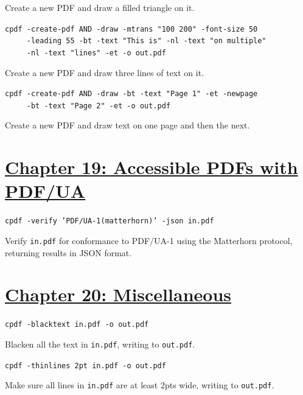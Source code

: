 \documentclass{book}
\begin{document}
\noindent Create a new PDF and draw a filled triangle on it.

\begin{framed}
 \noindent\small\verb?cpdf -create-pdf AND -draw -mtrans "100 200" -font-size 50?\\
 \noindent\small\verb?     -leading 55 -bt -text "This is" -nl -text "on multiple"?\\
 \noindent\small\verb?     -nl -text "lines" -et -o out.pdf?
\end{framed}

\noindent Create a new PDF and draw three lines of text on it.

\begin{framed}
 \noindent\small\verb!cpdf -create-pdf AND -draw -bt -text "Page 1" -et -newpage!\\
 \noindent\small\verb!     -bt -text "Page 2" -et -o out.pdf!
\end{framed}

\noindent Create a new PDF and draw text on one page and then the next.

\section*{\hyperref[chap:misc]{Chapter 19: Accessible PDFs with PDF/UA}}

\begin{framed}\noindent\texttt{cpdf -verify 'PDF/UA-1(matterhorn)' -json in.pdf}\end{framed}

\noindent Verify \texttt{in.pdf} for conformance to PDF/UA-1 using the Matterhorn protocol, returning results in JSON format.

\section*{\hyperref[chap:misc]{Chapter 20: Miscellaneous}}

\begin{framed}\noindent\texttt{cpdf -blacktext in.pdf -o out.pdf}\end{framed}

\noindent Blacken all the text in \texttt{in.pdf}, writing to \texttt{out.pdf}.

\begin{framed}\noindent\texttt{cpdf -thinlines 2pt in.pdf -o out.pdf}\end{framed}

\noindent Make sure all lines in \texttt{in.pdf} are at least 2pts wide, writing to \texttt{out.pdf}.
\end{document}

